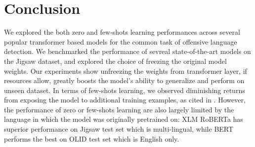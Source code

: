 \documentclass[11pt,a4paper]{article}
\begin{document}
\section{Conclusion}
We explored the both zero and few-shots learning performances across several popular transformer based models for the common task of offensive language detection. We benchmarked the performance of sevreal state-of-the-art models on the Jigsaw dataset, and explored the choice of freezing the original model weights. Our experiments show unfreezing the weights from transformer layer, if resources allow, greatly boosts the model's ability to generalize and perform on unseen dataset. In terms of few-shots learning, we observed diminishing returns from exposing the model to additional training examples, as cited in \citep{cer2018universal}. However, the performance of zero or few-shots learning are also largely limited by the language in which the model was originally pretrained on: XLM RoBERTa has superior performance on Jigsaw test set which is multi-lingual, while BERT performs the best on OLID test set which is English only. 



\end{document}

